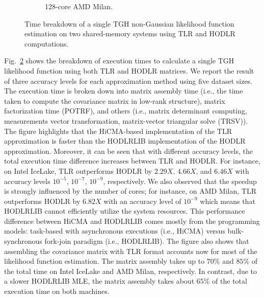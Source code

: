 \documentclass[conference]{IEEEtran}
\begin{document}
\begin{figure}
\begin{subfigure}[b]{0.43\textwidth}
     \caption{128-core AMD Milan.}
     \label{fig:tlrhodlr-kanary}
    \end{subfigure}
     \caption{Time breakdown of a single TGH non-Gaussian likelihood function estimation on two shared-memory systems using TLR and HODLR computations.}
       \label{fig:tlr-vs-hodlr}
     \end{figure}
     
     

Fig.~\ref{fig:tlr-vs-hodlr} shows the breakdown of execution times to
calculate a single TGH likelihood function using both TLR
and HODLR matrices. We report the result of three
accuracy levels for each approximation method using
five dataset sizes. The execution time is broken down into matrix assembly time
(i.e., the time taken to compute the covariance matrix in low-rank structure), matrix factorization time (POTRF), and
others (i.e., matrix determinant computing, measurements vector
transformation, matrix-vector triangular solve (TRSV)).  
The figure highlights that the HiCMA-based
implementation of the TLR approximation is faster than
the HODLRLIB implementation of the HODLR approximation.
Moreover, it can be seen that with different accuracy levels, the total
execution time difference increases between TLR and HODLR. For instance, on Intel IceLake, TLR outperforms HODLR by $2.29X$, $4.66X$, and $6.46X$ with accuracy levels $10^{-5}$, $10^{-7}$, $10^{-9}$, respectively. We also observed that the speedup is strongly influenced by the number of cores; for instance, on AMD Milan, TLR 
outperforms HODLR by $6.82X$ with an accuracy level of $10^{-9}$ which means that HODLRLIB cannot efficiently utilize the 
system resources. This performance difference between HiCMA and HODLRLIB comes mostly
from the programming models: task-based with asynchronous executions (i.e., HiCMA) versus
bulk-synchronous fork-join paradigm (i.e., HODLRLIB).
The figure also shows that assembling the covariance 
matrix with TLR format accounts now for most of the 
likelihood function estimation. The matrix assembly takes up to 
$70\%$ and $85\%$ of the total time on Intel IceLake and AMD Milan, respectively. 
In contrast, due to a slower HODLRLIB MLE, 
the matrix assembly takes about $65\%$ of the total execution time on 
both machines. 
\end{document}
